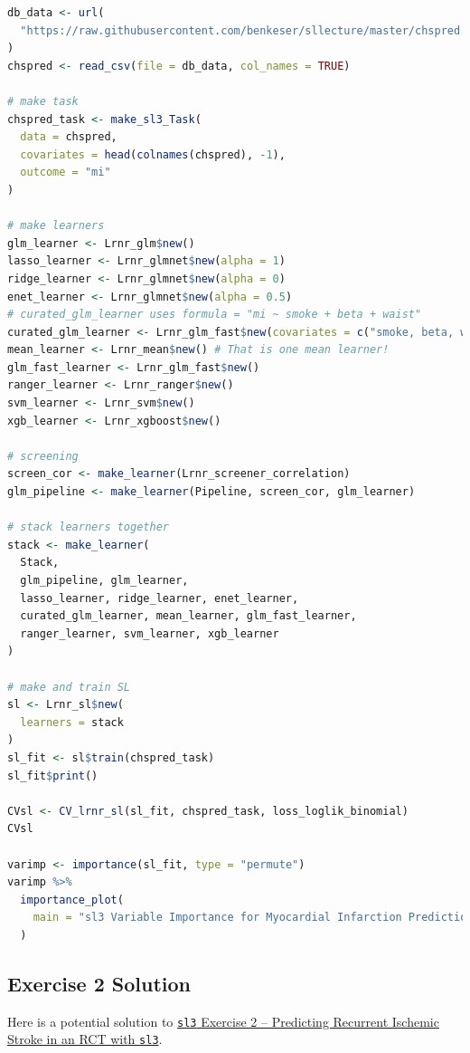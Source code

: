 \documentclass[12pt, krantz2,]{krantz}
\newcommand{\passthrough}[1]{#1}
\theoremstyle{definition}
\theoremstyle{definition}
\theoremstyle{definition}
\newcommand{\1}{\mathbbm{1}}
\begin{document}
\begin{lstlisting}[language=R]
db_data <- url(
  "https://raw.githubusercontent.com/benkeser/sllecture/master/chspred.csv"
)
chspred <- read_csv(file = db_data, col_names = TRUE)

# make task
chspred_task <- make_sl3_Task(
  data = chspred,
  covariates = head(colnames(chspred), -1),
  outcome = "mi"
)

# make learners
glm_learner <- Lrnr_glm$new()
lasso_learner <- Lrnr_glmnet$new(alpha = 1)
ridge_learner <- Lrnr_glmnet$new(alpha = 0)
enet_learner <- Lrnr_glmnet$new(alpha = 0.5)
# curated_glm_learner uses formula = "mi ~ smoke + beta + waist"
curated_glm_learner <- Lrnr_glm_fast$new(covariates = c("smoke, beta, waist"))
mean_learner <- Lrnr_mean$new() # That is one mean learner!
glm_fast_learner <- Lrnr_glm_fast$new()
ranger_learner <- Lrnr_ranger$new()
svm_learner <- Lrnr_svm$new()
xgb_learner <- Lrnr_xgboost$new()

# screening
screen_cor <- make_learner(Lrnr_screener_correlation)
glm_pipeline <- make_learner(Pipeline, screen_cor, glm_learner)

# stack learners together
stack <- make_learner(
  Stack,
  glm_pipeline, glm_learner,
  lasso_learner, ridge_learner, enet_learner,
  curated_glm_learner, mean_learner, glm_fast_learner,
  ranger_learner, svm_learner, xgb_learner
)

# make and train SL
sl <- Lrnr_sl$new(
  learners = stack
)
sl_fit <- sl$train(chspred_task)
sl_fit$print()

CVsl <- CV_lrnr_sl(sl_fit, chspred_task, loss_loglik_binomial)
CVsl

varimp <- importance(sl_fit, type = "permute")
varimp %>%
  importance_plot(
    main = "sl3 Variable Importance for Myocardial Infarction Prediction"
  )
\end{lstlisting}

\hypertarget{sl3ex2-sol}{%
\subsection{Exercise 2 Solution}\label{sl3ex2-sol}}

Here is a potential solution to \protect\hyperlink{sl3ex2}{\passthrough{\lstinline!sl3!} Exercise 2 -- Predicting Recurrent
Ischemic Stroke in an RCT with \passthrough{\lstinline!sl3!}}.
\end{document}
